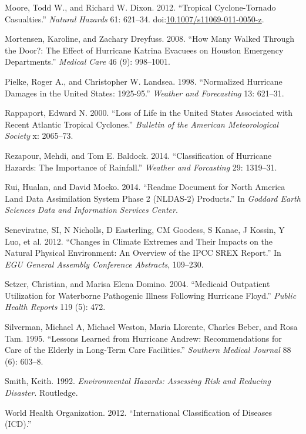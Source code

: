 \documentclass[]{elsarticle} %
\begin{document}
\hypertarget{ref-Moore2012}{}
Moore, Todd W., and Richard W. Dixon. 2012. ``Tropical Cyclone-Tornado
Casualties.'' \emph{Natural Hazards} 61: 621--34.
doi:\href{https://doi.org/10.1007/s11069-011-0050-z}{10.1007/s11069-011-0050-z}.

\hypertarget{ref-Mortensen2008}{}
Mortensen, Karoline, and Zachary Dreyfuss. 2008. ``How Many Walked
Through the Door?: The Effect of Hurricane Katrina Evacuees on Houston
Emergency Departments.'' \emph{Medical Care} 46 (9): 998--1001.

\hypertarget{ref-Pielke1998}{}
Pielke, Roger A., and Christopher W. Landsea. 1998. ``Normalized
Hurricane Damages in the United States: 1925-95.'' \emph{Weather and
Forecasting} 13: 621--31.

\hypertarget{ref-Rappaport2000}{}
Rappaport, Edward N. 2000. ``Loss of Life in the United States
Associated with Recent Atlantic Tropical Cyclones.'' \emph{Bulletin of
the American Meteorological Society} x: 2065--73.

\hypertarget{ref-Rezapour2014}{}
Rezapour, Mehdi, and Tom E. Baldock. 2014. ``Classification of Hurricane
Hazards: The Importance of Rainfall.'' \emph{Weather and Forcasting} 29:
1319--31.

\hypertarget{ref-Rui2014}{}
Rui, Hualan, and David Mocko. 2014. ``Readme Document for North America
Land Data Assimilation System Phase 2 (NLDAS-2) Products.'' In
\emph{Goddard Earth Sciences Data and Information Services Center}.

\hypertarget{ref-Seneviratne2012}{}
Seneviratne, SI, N Nicholls, D Easterling, CM Goodess, S Kanae, J
Kossin, Y Luo, et al. 2012. ``Changes in Climate Extremes and Their
Impacts on the Natural Physical Environment: An Overview of the IPCC
SREX Report.'' In \emph{EGU General Assembly Conference Abstracts},
109--230.

\hypertarget{ref-Setzer2004}{}
Setzer, Christian, and Marisa Elena Domino. 2004. ``Medicaid Outpatient
Utilization for Waterborne Pathogenic Illness Following Hurricane
Floyd.'' \emph{Public Health Reports} 119 (5): 472.

\hypertarget{ref-Silverman1995}{}
Silverman, Michael A, Michael Weston, Maria Llorente, Charles Beber, and
Rosa Tam. 1995. ``Lessons Learned from Hurricane Andrew: Recommendations
for Care of the Elderly in Long-Term Care Facilities.'' \emph{Southern
Medical Journal} 88 (6): 603--8.

\hypertarget{ref-Smith1992}{}
Smith, Keith. 1992. \emph{Environmental Hazards: Assessing Risk and
Reducing Disaster}. Routledge.

\hypertarget{ref-WHO2012}{}
World Health Organization. 2012. ``International Classification of
Diseases (ICD).''
\end{document}
